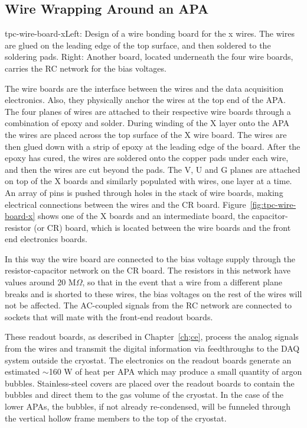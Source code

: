 \subsection{Wire Wrapping Around an APA}
\label{subsec:fd-ref-wirewrap}


\begin{cdrfigure}{tpc-wire-board-x}{Left: Design of a wire bonding board for the x wires.  The wires are glued on the leading edge of the top surface, and then soldered to the soldering pads. Right: Another board, located underneath the four wire boards, carries the RC network for the bias voltages.}
\end{cdrfigure}

The wire boards are the interface between the wires and the data acquisition electronics.  Also, they physically anchor the wires at the top end of the APA.  The four planes of wires are attached to their respective wire boards through a combination of epoxy and solder. During winding of the X layer onto the APA the wires are placed across the top surface of the X wire board. The wires are then glued down with a strip of epoxy at the leading edge of the board.  After the epoxy has cured, the wires are soldered onto the copper pads under each wire, and then the wires are cut beyond the pads. The V, U and G planes are attached on top of the X boards and similarly populated with wires, one layer at a time. An array of pins is pushed through holes in the stack of wire boards, making electrical connections between the wires and the CR board.   
Figure~\ref{fig:tpc-wire-board-x} shows one of the X boards and an intermediate board, the capacitor-resistor (or CR) board, which is located between the wire boards and the front end electronics boards.  

In this way the wire board are connected to the bias voltage supply through the resistor-capacitor network on the CR board. The resistors in this network have values around 20 M$\Omega$, so that in the event that a wire from a different plane breaks and is shorted to these wires, the bias voltages on the rest of the wires will not be affected. The AC-coupled signals from the RC network are connected to sockets that will mate with the front-end readout boards.

These readout boards, as described in Chapter~\ref{ch;ce}, process the analog signals from the wires and transmit the digital information via feedthroughs to the DAQ system outside the cryostat. The electronics on the readout boards generate an estimated $\sim$160 W of heat per APA which may produce a small quantity of argon bubbles.  Stainless-steel covers are placed over the readout boards to contain the bubbles and direct them to the gas volume of the cryostat. In the case of the lower APAs, the bubbles, if not already re-condensed, will be funneled through the vertical hollow frame members to the top of the cryostat.


